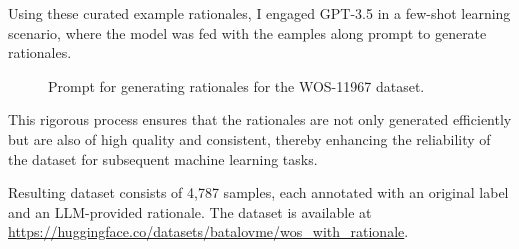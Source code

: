 Using these curated example rationales, I engaged GPT-3.5 in a few-shot learning scenario, where the model was fed with the eamples along prompt to generate rationales.

\begin{figure}[ht!]
    \centering
    
    \caption{Prompt for generating rationales for the WOS-11967 dataset.}
    \label{fig:wos_prompt}
\end{figure}

This rigorous process ensures that the rationales are not only generated efficiently but are also of high quality and consistent, thereby enhancing the reliability of the dataset for subsequent machine learning tasks.

Resulting dataset consists of 4,787 samples, each annotated with an original label and an LLM-provided rationale. The dataset is available at \linebreak \url{https://huggingface.co/datasets/batalovme/wos_with_rationale}.
